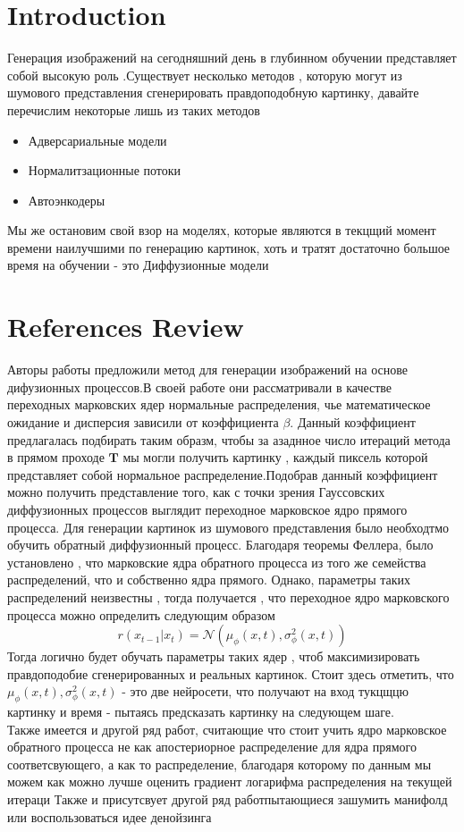 
 

\section{Introduction}
Генерация изображений на сегодняшний день в глубинном обучении представляет собой высокую роль .Существует несколько методов , которую могут из шумового представления сгенерировать правдоподобную картинку, давайте перечислим некоторые лишь из таких методов
\begin{itemize}
    \item Адверсариальные модели
    \item Нормалитзационные потоки
    \item Автоэнкодеры
    

\end{itemize}
Мы же остановим свой взор на моделях, которые являются в текцщий момент времени  наилучшими по генерацию картинок, хоть и тратят достаточно большое время на обучении - это Диффузионные модели

\section{References Review}
Авторы работы \cite{Jasha}предложили метод для генерации изображений на основе дифузионных процессов.В своей работе они рассматривали в качестве переходных марковских ядер нормальные распределения, чье математическое ожидание и дисперсия зависили от коэффициента $\beta$. Данный коэффициент предлагалась подбирать таким образм, чтобы за азаднное число итераций метода в прямом проходе $\textbf{T}  $ мы могли получить картинку , каждый пиксель которой представляет собой нормальное распределение.Подобрав данный коэффициент можно получить представление того, как с точки зрения Гауссовских диффузионных процессов выглядит переходное марковское ядро прямого процесса. Для генерации картинок из шумового представления было необходтмо обучить обратный диффузионный процесс. Благодаря теоремы Феллера, было установлено , что марковские ядра обратного процесса из того же семейства распределений, что и собственно ядра прямого. Однако, параметры таких распределений неизвестны , тогда получается , что переходное ядро марковского процесса можно определить следующим образом
$$ r(x_{t-1}|x_{t}) = \mathcal{N}(\mu_{\phi }(x,t),\sigma^{2}_{\phi}(x,t)) $$
Тогда логично будет обучать параметры таких ядер , чтоб максимизировать правдоподобие сгенерированных и реальных картинок. Стоит здесь отметить, что 
$\mu_{\phi }(x,t), \sigma^{2}_{\phi}(x,t)$ - это две нейросети, что получают на вход тукцщцю картинку и время - пытаясь предсказать картинку на следующем шаге.
\\[0.3 cm]
Также имеется и другой ряд работ, считающие что стоит учить ядро марковское обратного процесса не как апостериорное распределение для ядра прямого соответсвующего, а как то распределение, благодаря которому по данным мы можем как можно лучше оценить градиент логарифма распределения на текущей итераци  \cite{Ermo}
Также и присутсвует другой ряд работпытающиеся зашумить манифолд или воспользоваться идее денойзинга \cite{Deno}
